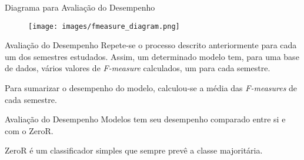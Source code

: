 \begin{frame}{Diagrama para Avaliação do Desempenho}
    \begin{figure}[!ht]
        \centering
        \texttt{[image: images/fmeasure\_diagram.png]}
    \end{figure}
\end{frame}

\begin{frame}{Avaliação do Desempenho}
    Repete-se o processo descrito anteriormente para cada um dos semestres estudados.
    Assim, um determinado modelo tem, para uma base de dados, vários valores de
    \textit{F-measure} calculados, um para cada semestre. 

    \vspace{0.5cm}

    Para sumarizar o desempenho do modelo, calculou-se a média das
    \textit{F-measures} de cada semestre. 
\end{frame}

\begin{frame}{Avaliação do Desempenho}
    Modelos tem seu desempenho comparado entre si e com o ZeroR. 

    \vspace{0.5cm}

    ZeroR é um classificador simples que sempre prevê a classe majoritária. 
\end{frame}



